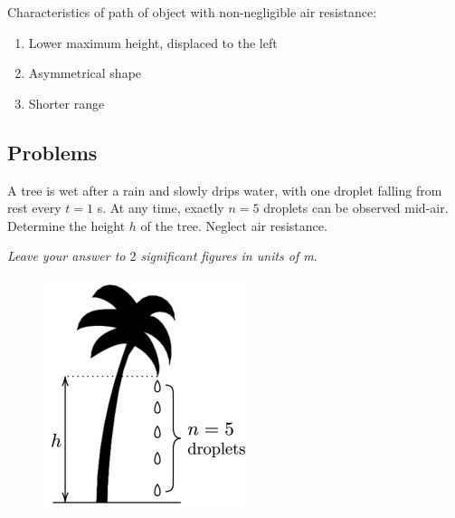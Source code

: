 Characteristics of path of object with non-negligible air resistance:
\begin{enumerate}
    \item Lower maximum height, displaced to the left
    \item Asymmetrical shape
    \item Shorter range
\end{enumerate}

\begin{figure}[H]
\centering
{}
\end{figure}
\pagebreak

\subsection{Problems}
\begin{prbm}
A tree is wet after a rain and slowly drips water, with one droplet falling from rest every $t = 1$ \unit{s}. At any time, exactly $n = 5$ droplets can be observed mid-air. Determine the height $h$ of the tree. Neglect air resistance.

\textit{Leave your answer to $2$ significant figures in units of \unit{m}}.

\begin{figure}[H]
    \centering
    \includegraphics{images/Wet_Tree.png}
\end{figure}
\end{prbm}


